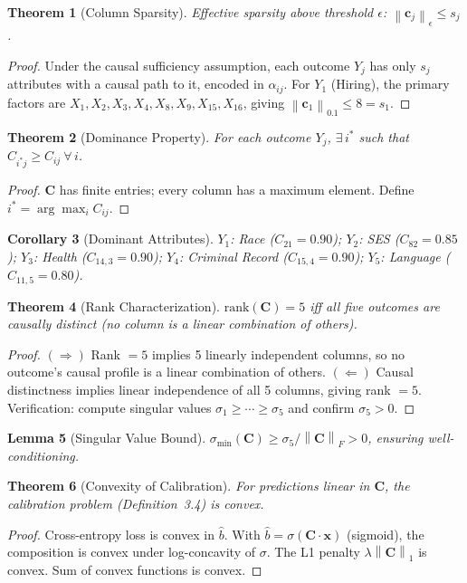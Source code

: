 \documentclass[12pt,a4paper]{report}
\theoremstyle{plain}
\newtheorem{theorem}{Theorem}[chapter]
\newtheorem{lemma}[theorem]{Lemma}
\newtheorem{corollary}[theorem]{Corollary}
\theoremstyle{definition}
\theoremstyle{remark}
\newcommand{\scam}{\mathbf{C}}
\newcommand{\norm}[1]{\left\|#1\right\|}
\begin{document}
\begin{theorem}[Column Sparsity]
\label{thm:sparsity}
Effective sparsity above threshold $\epsilon$:
$\norm{\mathbf{c}_j}_\epsilon \leq s_j$.
\end{theorem}
\begin{proof}
Under the causal sufficiency assumption, each outcome
$Y_j$ has only $s_j$ attributes with a causal path to it,
encoded in $\alpha_{ij}$. For $Y_1$ (Hiring), the primary
factors are $X_1,X_2,X_3,X_4,X_8,X_9,X_{15},X_{16}$,
giving $\norm{\mathbf{c}_1}_{0.1} \leq 8 = s_1$.
\end{proof}

\begin{theorem}[Dominance Property]
\label{thm:dominance}
For each outcome $Y_j$, $\exists\, i^*$ such that
$C_{i^*j} \geq C_{ij}\ \forall\, i$.
\end{theorem}
\begin{proof}
$\scam$ has finite entries; every column has a maximum
element. Define $i^* = \arg\max_i C_{ij}$.
\end{proof}

\begin{corollary}[Dominant Attributes]
\label{cor:dominant}
$Y_1$: Race ($C_{21}=0.90$);\quad
$Y_2$: SES ($C_{82}=0.85$);\quad
$Y_3$: Health ($C_{14,3}=0.90$);\quad
$Y_4$: Criminal Record ($C_{15,4}=0.90$);\quad
$Y_5$: Language ($C_{11,5}=0.80$).
\end{corollary}

\begin{theorem}[Rank Characterization]
\label{thm:rank}
$\mathrm{rank}(\scam) = 5$ iff all five outcomes are
causally distinct (no column is a linear combination
of others).
\end{theorem}
\begin{proof}
$(\Rightarrow)$ Rank $=5$ implies 5 linearly independent
columns, so no outcome's causal profile is a linear
combination of others.
$(\Leftarrow)$ Causal distinctness implies linear
independence of all 5 columns, giving rank $= 5$.
Verification: compute singular values $\sigma_1 \geq
\cdots \geq \sigma_5$ and confirm $\sigma_5 > 0$.
\end{proof}

\begin{lemma}[Singular Value Bound]
\label{lem:sv}
$\sigma_{\min}(\scam) \geq \sigma_5/\norm{\scam}_F > 0$,
ensuring well-conditioning.
\end{lemma}

\begin{theorem}[Convexity of Calibration]
\label{thm:convex}
For predictions linear in $\scam$, the calibration
problem (Definition~3.4) is convex.
\end{theorem}
\begin{proof}
Cross-entropy loss is convex in $\hat{b}$.
With $\hat{b} = \sigma(\scam \cdot \mathbf{x})$
(sigmoid), the composition is convex under log-concavity
of $\sigma$. The L1 penalty $\lambda\norm{\scam}_1$ is
convex. Sum of convex functions is convex.
\end{proof}
\end{document}
